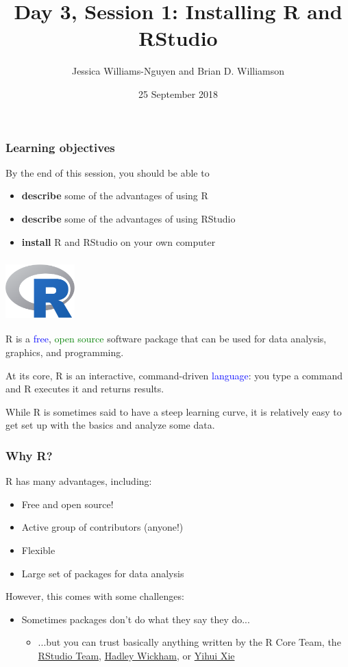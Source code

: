 \documentclass[11pt]{beamer}
\title{Day 3, Session 1: Installing R and RStudio}
\author{Jessica Williams-Nguyen and Brian D. Williamson}
\institute{EPI/BIOST Bootcamp 2018}
\date{25 September 2018}
\newcommand{\myframe}[1]{\begin{frame} \frametitle{#1}}
\newenvironment{spaceitemize}
{ \begin{itemize}
    \setlength{\itemsep}{10pt}
    \setlength{\parskip}{0pt}
    \setlength{\parsep}{0pt}     }
{ \end{itemize}                  }
\begin{document}
\begin{frame}
\titlepage
\end{frame}

\begin{frame}
\frametitle{Learning objectives}
By the end of this session, you should be able to
\begin{itemize}
\item \textbf{describe} some of the advantages of using R
\item \textbf{describe} some of the advantages of using RStudio
\item \textbf{install} R and RStudio on your own computer
\end{itemize}
\end{frame}

\myframe{\includegraphics[width = 0.2\textwidth]{figs/Rlogo.png}}
R is a \textcolor{blue}{free}, \textcolor{green}{open source} software package that can be used for data analysis, graphics, and programming. 

At its core, R is an interactive, command-driven \textcolor{blue}{language}: you type a command and R executes it and returns results. 

While R is sometimes said to have a steep learning curve, it is relatively easy to get set up with the basics and analyze some data.
\end{frame}

\myframe{Why R?}
R has many advantages, including:
\begin{spaceitemize}
\item Free and open source!
\item Active group of contributors (anyone!)
\item Flexible
\item Large set of packages for data analysis
\end{spaceitemize}

However, this comes with some challenges:
\begin{spaceitemize}
\item Sometimes packages don't do what they say they do...
\begin{itemize}
\item ...but you can trust basically anything written by the R Core Team, the \href{https://www.rstudio.com/products/rpackages/}{RStudio Team}, \href{http://hadley.nz/}{Hadley Wickham}, or \href{https://github.com/yihui}{Yihui Xie}
\end{itemize}
\end{spaceitemize}
\end{frame}
\end{document}
